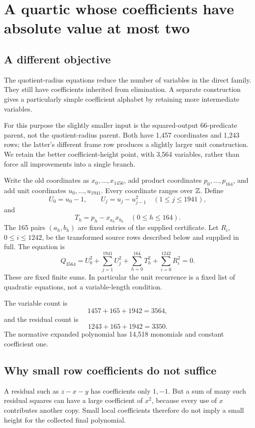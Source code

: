 \section{A quartic whose coefficients have absolute value at most two}\label{sec:height}
\subsection{A different objective}

The quotient-radius equations reduce the number of variables in the direct family. They still have coefficients inherited from elimination. A separate construction gives a particularly simple coefficient alphabet by retaining more intermediate variables.

For this purpose the slightly smaller input is the squared-output 66-predicate parent, not the quotient-radius parent. Both have 1,457 coordinates and 1,243 rows; the latter's different frame row produces a slightly larger unit construction. We retain the better coefficient-height point, with 3,564 variables, rather than force all improvements into a single branch.

Write the old coordinates as \(x_0,\ldots,x_{1456}\), add product coordinates \(p_0,\ldots,p_{164}\), and add unit coordinates \(u_0,\ldots,u_{1941}\). Every coordinate ranges over \(\mathbb Z\). Define
\[
U_0=u_0-1,\qquad U_j=u_j-u_{j-1}^2\quad(1\le j\le1941),
\]
and
\[
T_h=p_h-x_{a_h}x_{b_h}\quad(0\le h\le164).
\]
The 165 pairs \((a_h,b_h)\) are fixed entries of the supplied certificate. Let \(R_i\), \(0\le i\le1242\), be the transformed source rows described below and supplied in full. The equation is
\begin{equation}\label{eq:unitpolynomial}
\boxed{Q_{3564}=U_0^2+\sum_{j=1}^{1941}U_j^2+
\sum_{h=0}^{164}T_h^2+\sum_{i=0}^{1242}R_i^2=0.}
\end{equation}
These are fixed finite sums. In particular the unit recurrence is a fixed list of quadratic equations, not a variable-length condition.

The variable count is
\[
1457+165+1942=3564,
\]
and the residual count is
\[
1243+165+1942=3350.
\]
The normative expanded polynomial has 14,518 monomials and constant coefficient one.

\subsection{Why small row coefficients do not suffice}

A residual such as \(z-x-y\) has coefficients only \(1,-1\). But a sum of many such residual squares can have a large coefficient of \(x^2\), because every use of \(x\) contributes another copy. Small local coefficients therefore do not imply a small height for the collected final polynomial.

